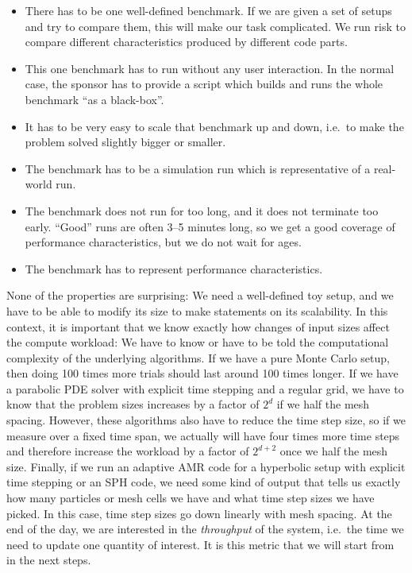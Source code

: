 \begin{itemize}
  \item There has to be one well-defined benchmark. If we are given a set of
    setups and try to compare them, this will make our task complicated. We run
    risk to compare different characteristics produced by different code parts.
  \item This one benchmark has to run without any user interaction. In the
    normal case, the sponsor has to provide a script which builds and runs the
    whole benchmark ``as a black-box''.
  \item It has to be very easy to scale that benchmark up and down, i.e.~to make the problem solved slightly bigger or smaller. 
  \item The benchmark has to be a simulation run which is representative of a real-world run.
  \item The benchmark does not run for too long, and it does not terminate too early. ``Good'' runs are often 3--5 minutes
    long, so we get a good coverage of performance characteristics, but we do not wait for ages. 
  \item The benchmark has to represent performance characteristics.
\end{itemize}

\noindent
None of the properties are surprising:
We need a well-defined toy setup, and we have to be able to modify its size to make statements on its scalability.
In this context, it is important that we know exactly how changes of input sizes affect the compute workload:
We have to know or have to be told the computational complexity of the underlying algorithms. 
If we have a pure Monte Carlo setup, then doing 100 times more trials should last around 100 times longer.
If we have a parabolic PDE solver with explicit time stepping and a regular grid, we have to know that the problem sizes increases by a factor of $2^d$ if we half the mesh spacing. 
However, these algorithms also have to reduce the time step size, so if we measure over a fixed time span, we actually will have four times more time steps and therefore increase the workload by a factor of $2^{d+2}$ once we half the mesh size.
Finally, if we run an adaptive AMR code for a hyperbolic setup with explicit time stepping or an SPH code, we need some kind of output that tells us exactly how many particles or mesh cells we have and what time step sizes we have picked. In this case, time step sizes go down linearly with mesh spacing.
At the end of the day, we are interested in the \emph{throughput} of the system, i.e.~the time we need to update one quantity of interest.
It is this metric that we will start from in the next steps. 


